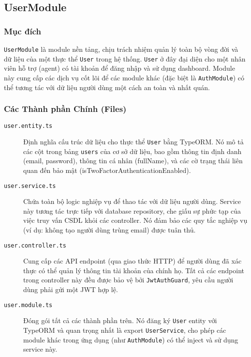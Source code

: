 \subsection{UserModule}
\label{subsec:user-module}

\subsubsection{Mục đích}

\texttt{UserModule} là module nền tảng, chịu trách nhiệm quản lý toàn bộ vòng đời và dữ liệu của một thực thể \texttt{User} trong hệ thống. \texttt{User} ở đây đại diện cho một nhân viên hỗ trợ (agent) có tài khoản để đăng nhập và sử dụng dashboard. Module này cung cấp các dịch vụ cốt lõi để các module khác (đặc biệt là \texttt{AuthModule}) có thể tương tác với dữ liệu người dùng một cách an toàn và nhất quán.

\subsubsection{Các Thành phần Chính (Files)}

\begin{description}
    \item[\texttt{user.entity.ts}] Định nghĩa cấu trúc dữ liệu cho thực thể \texttt{User} bằng TypeORM. Nó mô tả các cột trong bảng \texttt{users} của cơ sở dữ liệu, bao gồm thông tin định danh (email, password), thông tin cá nhân (fullName), và các cờ trạng thái liên quan đến bảo mật (isTwoFactorAuthenticationEnabled).
    
    \item[\texttt{user.service.ts}] Chứa toàn bộ logic nghiệp vụ để thao tác với dữ liệu người dùng. Service này tương tác trực tiếp với database repository, che giấu sự phức tạp của việc truy vấn CSDL khỏi các controller. Nó đảm bảo các quy tắc nghiệp vụ (ví dụ: không tạo người dùng trùng email) được tuân thủ.
    
    \item[\texttt{user.controller.ts}] Cung cấp các API endpoint (qua giao thức HTTP) để người dùng đã xác thực có thể quản lý thông tin tài khoản của chính họ. Tất cả các endpoint trong controller này đều được bảo vệ bởi \texttt{JwtAuthGuard}, yêu cầu người dùng phải gửi một JWT hợp lệ.
    
    \item[\texttt{user.module.ts}] Đóng gói tất cả các thành phần trên. Nó đăng ký \texttt{User} entity với TypeORM và quan trọng nhất là export \texttt{UserService}, cho phép các module khác trong ứng dụng (như \texttt{AuthModule}) có thể inject và sử dụng service này.
\end{description}

